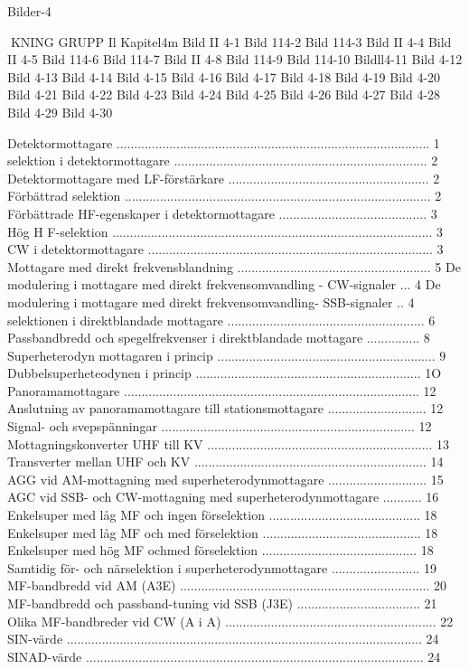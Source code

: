 Bilder-4

KNING
GRUPP Il
Kapitel4m
Bild II 4-1
Bild 114-2
Bild 114-3
Bild II 4-4
Bild II 4-5
Bild 114-6
Bild 114-7
Bild II 4-8
Bild 114-9
Bild 114-10
Bildll4-11
Bild 4-12
Bild 4-13
Bild 4-14
Bild 4-15
Bild 4-16
Bild 4-17
Bild 4-18
Bild 4-19
Bild 4-20
Bild 4-21
Bild 4-22
Bild 4-23
Bild 4-24
Bild 4-25
Bild 4-26
Bild 4-27
Bild 4-28
Bild 4-29
Bild 4-30

Detektormottagare ......................................................................................... 1
selektion i detektormottagare ........................................................................ 2
Detektormottagare med LF-förstärkare ......................................................... 2
Förbättrad selektion ....................................................................................... 2
Förbättrade HF-egenskaper i detektormottagare .......................................... 3
Hög H F-selektion ........................................................................................... 3
CW i detektormottagare ................................................................................. 3
Mottagare med direkt frekvensblandning ....................................................... 5
De modulering i mottagare med direkt frekvensomvandling - CW-signaler ... 4
De modulering i mottagare med direkt frekvensomvandling- SSB-signaler .. 4
selektionen i direktblandade mottagare ........................................................ 6
Passbandbredd och spegelfrekvenser i direktblandade mottagare ............... 8
Superheterodyn mottagaren i princip .............................................................. 9
Dubbelsuperheteodynen i princip ................................................................ 1O
Panoramamottagare .................................................................................... 12
Anslutning av panoramamottagare till stationsmottagare ............................ 12
Signal- och svepspänningar ........................................................................ 12
Mottagningskonverter UHF till KV ................................................................ 13
Transverter mellan UHF och KV .................................................................. 14
AGG vid AM-mottagning med superheterodynmottagare ............................ 15
AGC vid SSB- och CW-mottagning med superheterodynmottagare ........... 16
Enkelsuper med låg MF och ingen förselektion ........................................... 18
Enkelsuper med låg MF och med förselektion ............................................. 18
Enkelsuper med hög MF ochmed förselektion ............................................ 18
Samtidig för- och närselektion i superheterodynmottagare ......................... 19
MF-bandbredd vid AM (A3E) ....................................................................... 20
MF-bandbredd och passband-tuning vid SSB (J3E) ................................... 21
Olika MF-bandbreder vid CW (A i A) ............................................................ 22
SIN-värde ..................................................................................................... 24
SINAD-värde ................................................................................................ 24

